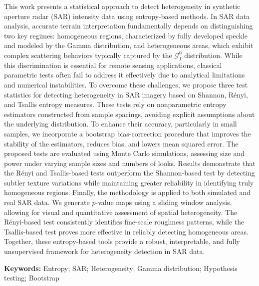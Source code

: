 
This work presents a statistical approach to detect heterogeneity 
in synthetic aperture radar (SAR) intensity data using entropy-based methods.
In SAR data analysis, accurate terrain interpretation fundamentally depends 
on distinguishing two key regimes: homogeneous regions, characterized by fully 
developed speckle and modeled by the Gamma distribution, and heterogeneous areas, 
which exhibit complex scattering behaviors typically captured by the $\mathcal{G}_I^0$ distribution.
While this discrimination is essential for remote sensing applications, classical parametric tests often fail to address it 
effectively due to analytical limitations and numerical instabilities.
To overcome these challenges, we propose three test statistics for detecting heterogeneity 
in SAR imagery based on Shannon, Rényi, and Tsallis entropy measures. These tests rely on 
nonparametric entropy estimators constructed from sample spacings, avoiding explicit assumptions 
about the underlying distribution. To enhance their accuracy, particularly in small samples, 
we incorporate a bootstrap bias-correction procedure that improves the stability of the estimators, 
reduces bias, and lowers mean squared error.
The proposed tests are evaluated using Monte Carlo simulations, assessing size and power 
under varying sample sizes and numbers of looks.
Results demonstrate that the Rényi and Tsallis-based tests outperform the Shannon-based test by detecting subtler texture variations 
while maintaining greater reliability in identifying 
truly homogeneous regions.
Finally, the methodology is applied to both simulated and real SAR data. We generate $p$-value maps using a 
sliding window analysis, allowing for visual and quantitative assessment of spatial heterogeneity. 
The Rényi-based test consistently identifies fine-scale roughness patterns, while the Tsallis-based 
test proves more effective in reliably detecting homogeneous areas. Together, these entropy-based 
tools provide a robust, interpretable, and fully unsupervised framework for heterogeneity detection 
in SAR data.

\vspace{1em}
\par
\noindent \textbf{Keywords:}  Entropy; SAR; Heterogeneity; Gamma distribution; Hypothesis testing; Bootstrap





